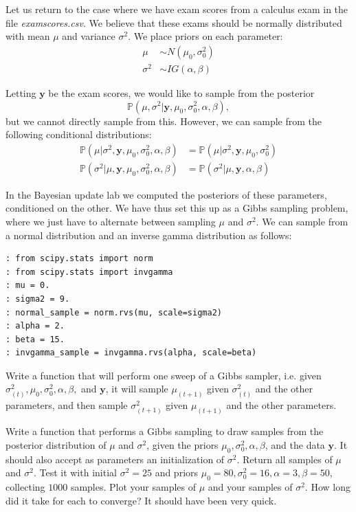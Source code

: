 Let us return to the case where we have exam scores from a calculus exam in the file \emph{examscores.csv}. We believe that these exams should be normally distributed with mean $\mu$ and variance $\sigma^{2}$. We place priors on each parameter:
\begin{align*}
\mu & \sim N(\mu_{0}, \sigma_{0}^{2}) \\
\sigma^{2} & \sim IG(\alpha, \beta)
\end{align*}

Letting $\mathbf{y}$ be the exam scores, we would like to sample from the posterior $$\mathbb{P}(\mu, \sigma^{2} | \mathbf{y}, \mu_{0}, \sigma_{0}^{2}, \alpha, \beta),$$ but we cannot directly sample from this. However, we can sample from the following conditional distributions:
\begin{align*}
\mathbb{P}(\mu | \sigma^{2}, \mathbf{y}, \mu_{0}, \sigma_{0}^{2}, \alpha, \beta) & = \mathbb{P}(\mu | \sigma^{2}, \mathbf{y}, \mu_{0}, \sigma_{0}^{2})\\
\mathbb{P}(\sigma^{2} | \mu, \mathbf{y}, \mu_{0}, \sigma_{0}^{2}, \alpha, \beta) & = \mathbb{P}(\sigma^{2} | \mu, \mathbf{y}, \alpha, \beta)
\end{align*}

In the Bayesian update lab we computed the posteriors of these parameters, conditioned on the other. We have thus set this up as a Gibbs sampling problem, where we just have to alternate between sampling $\mu$ and $\sigma^{2}$. We can sample from a normal distribution and an inverse gamma distribution as follows:

\begin{lstlisting}[style=python]
: from scipy.stats import norm
: from scipy.stats import invgamma
: mu = 0.
: sigma2 = 9.
: normal_sample = norm.rvs(mu, scale=sigma2)
: alpha = 2.
: beta = 15.
: invgamma_sample = invgamma.rvs(alpha, scale=beta)
\end{lstlisting}

\begin{problem}
Write a function that will perform one sweep of a Gibbs sampler, i.e. given $\sigma_{(t)}^{2}, \mu_{0}, \sigma_{0}^{2}, \alpha, \beta,$ and $\mathbf{y}$, it will sample $\mu_{(t+1)}$ given $\sigma_{(t)}^{2}$ and the other parameters, and then sample $\sigma_{(t+1)}^{2}$ given $\mu_{(t+1)}$ and the other parameters.
\end{problem}

\begin{problem}
Write a function that performs a Gibbs sampling to draw samples from the posterior distribution of $\mu$ and $\sigma^{2}$, given the priors $\mu_{0}, \sigma_{0}^{2}, \alpha,\beta$, and the data $\mathbf{y}$. It should also accept as parameters an initialization of $\sigma^{2}$. Return all samples of $\mu$ and $\sigma^{2}$. Test it with initial $\sigma^{2} = 25$ and priors $\mu_{0}=80, \sigma_{0}^{2} = 16, \alpha = 3, \beta = 50$, collecting $1000$ samples. Plot your samples of $\mu$ and your samples of $\sigma^{2}$. How long did it take for each to converge? It should have been very quick.
\end{problem}

